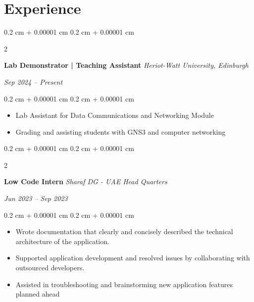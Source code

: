 \documentclass[10pt, letterpaper]{article}
\newenvironment{highlights}{
    \begin{itemize}[
        topsep=0.10 cm,
        parsep=0.10 cm,
        partopsep=0pt,
        itemsep=0pt,
        leftmargin=0.4 cm + 10pt
    ]
}{
    \end{itemize}
} %
\newenvironment{onecolentry}{
    \begin{adjustwidth}{
        0.2 cm + 0.00001 cm
    }{
        0.2 cm + 0.00001 cm
    }
}{
    \end{adjustwidth}
} %
\newenvironment{twocolentry}[2][]{
    \onecolentry
    \def\secondColumn{#2}
    \setcolumnwidth{\fill, 4.5 cm}
    \begin{paracol}{2}
}{
    \switchcolumn \raggedleft \secondColumn
    \end{paracol}
    \endonecolentry
} %
\begin{document}
    \section{Experience}
    \begin{twocolentry}{
        \textit{Sep 2024 – Present}}
        \textbf{Lab Demonstrator | Teaching Assistant}
        \textit{Heriot-Watt University, Edinburgh}
    \end{twocolentry}
    \vspace{0.10 cm}
    \begin{onecolentry}
        \begin{highlights}
            \item Lab Assistant for Data Communications and Networking Module
            \item Grading and assisting students with GNS3 and computer networking
        \end{highlights}
    \end{onecolentry}
        \vspace{0.2 cm}
    \begin{twocolentry}{
        \textit{Jun 2023 – Sep 2023}}
        \textbf{Low Code Intern}
        \textit{Sharaf DG - UAE Head Quarters}
    \end{twocolentry}
    \vspace{0.10 cm}
    \begin{onecolentry}
        \begin{highlights}
            \item Wrote documentation that clearly and concisely described the technical architecture of the application.
            \item Supported application development and resolved issues by collaborating with outsourced developers.
            \item Assisted in troubleshooting and brainstorming new application features planned ahead
        \end{highlights}
    \end{onecolentry}

    \vspace{0.2 cm}
\end{document}
